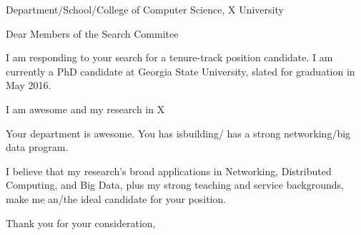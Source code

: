 \documentclass[12pt,a4paper]{letter}
\date{}
\begin{document}
 
\begin{letter}{Department/School/College of Computer Science, X University} 
\opening{Dear Members of the Search Commitee} 
 
I am responding to your search for a tenure-track position candidate.
I am currently a PhD candidate at Georgia State University, slated for graduation in May 2016.


I am awesome and my research in X

Your department is awesome.
You has isbuilding/ has a strong networking/big data program.



I believe that my research's broad applications in Networking, Distributed Computing, and Big Data, plus my strong teaching and service backgrounds, make me an/the ideal candidate for your position.


\closing{Thank you for your consideration,} 
\end{letter} 
\end{document}
